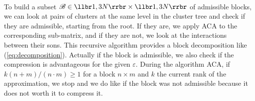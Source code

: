 \quad\\
To build a subset $\mathscr{B} \in \llbr 1,3N \rrbr \times \llbr 1,3N\rrbr $ of admissible blocks, we can look at pairs of clusters at the same level in the cluster tree and check if they are admissible, starting from the root. If they are, we apply ACA to the corresponding sub-matrix, and if they are not, we look at the interactions between their sons. This recursive algorithm provides a block decomposition like (\ref{eq:decomposition}).
Actually if the block is admissible, we also check if the compression is advantageous for the given $\varepsilon$. During the algorithm ACA, if $k(n+m)/(n\cdot m) \geq 1$ for a block $n\times m$ and $k$ the current rank of the approximation, we stop and we do like if the block was not admissible because it does not worth it to compress it.





